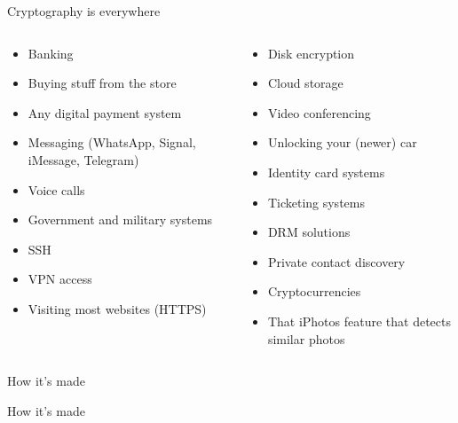 \documentclass[aspectratio=169, lualatex, handout]{beamer}
\begin{document}
\begin{frame}{Cryptography is everywhere}
	\begin{columns}[c]
		\begin{column}{0.5\textwidth}
			\begin{itemize}[<+->]
				\item Banking
				\item Buying stuff from the store
				\item Any digital payment system
				\item Messaging (WhatsApp, Signal, iMessage, Telegram)
				\item Voice calls
				\item Government and military systems
				\item SSH
				\item VPN access
				\item Visiting most websites (HTTPS)
			\end{itemize}
		\end{column}
		\begin{column}{0.5\textwidth}
			\begin{itemize}[<+->]
				\item Disk encryption
				\item Cloud storage
				\item Video conferencing
				\item Unlocking your (newer) car
				\item Identity card systems
				\item Ticketing systems
				\item DRM solutions
				\item Private contact discovery
				\item Cryptocurrencies
				\item That iPhotos feature that detects similar photos
			\end{itemize}
		\end{column}
	\end{columns}
\end{frame}

\begin{frame}{How it's made}
\end{frame}

\begin{frame}{How it's made}
	\begin{center}
	\end{center}
\end{frame}
\end{document}
